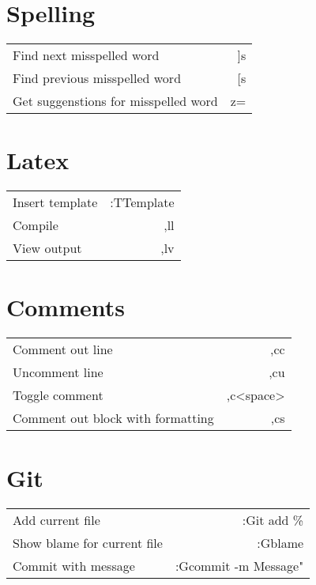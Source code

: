 \documentclass[a4paper]{report}
\begin{document}
\tableofcontents
\newpage
\section{Spelling}
\begin{tabular}{| l | r |}
  \hline
  Find next misspelled word & ]s \\
  Find previous misspelled word & [s \\
  Get suggenstions for misspelled word & z= \\
  \hline
\end{tabular}

\section{Latex}
\begin{tabular}{| l | r |}
  \hline
  Insert template & :TTemplate \\
  Compile & ,ll \\
  View output & ,lv\\
  \hline
\end{tabular}

\section{Comments}
\begin{tabular}{| l | r |}
  \hline
  Comment out line & ,cc \\
  Uncomment line & ,cu \\
  Toggle comment & ,c\textless space\textgreater \\
  Comment out block with formatting & ,cs \\
  \hline
\end{tabular}

\section{Git}
\begin{tabular}{| l | r |}
  \hline
  Add current file & :Git add \% \\
  Show blame for current file & :Gblame \\
  Commit with message & :Gcommit -m Message" \\
  \hline
\end{tabular}
\end{document}
